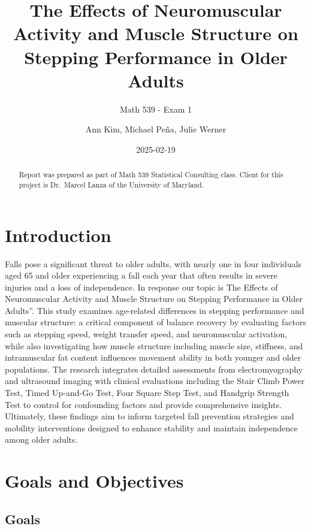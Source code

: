 \documentclass[
  letterpaper,
  DIV=11,
  numbers=noendperiod]{scrartcl}
\title{The Effects of Neuromuscular Activity and Muscle Structure on
Stepping Performance in Older Adults}
\subtitle{Math 539 - Exam 1}
\author{Ann Kim, Michael Peña, Julie Werner}
\date{2025-02-19}
\renewcommand*\contentsname{Table of contents}
\newcommand\contentsname{Table of contents}
\begin{document}
\maketitle
\begin{abstract}
\noindent Report was prepared as part of Math 539 Statistical Consulting
class. Client for this project is Dr.~Marcel Lanza of the University of
Maryland.
\end{abstract}

\renewcommand*\contentsname{Table of contents}
{
\hypersetup{linkcolor=}
\setcounter{tocdepth}{3}
\tableofcontents
}
\newpage

\section{Introduction}\label{introduction}

Falls pose a significant threat to older adults, with nearly one in four
individuals aged 65 and older experiencing a fall each year that often
results in severe injuries and a loss of independence. In response our
topic is The Effects of Neuromuscular Activity and Muscle Structure on
Stepping Performance in Older Adults''. This study examines age-related
differences in stepping performance and muscular structure: a critical
component of balance recovery by evaluating factors such as stepping
speed, weight transfer speed, and neuromuscular activation, while also
investigating how muscle structure including muscle size, stiffness, and
intramuscular fat content influences movement ability in both younger
and older populations. The research integrates detailed assessments from
electromyography and ultrasound imaging with clinical evaluations
including the Stair Climb Power Test, Timed Up-and-Go Test, Four Square
Step Test, and Handgrip Strength Test to control for confounding factors
and provide comprehensive insights. Ultimately, these findings aim to
inform targeted fall prevention strategies and mobility interventions
designed to enhance stability and maintain independence among older
adults.

\section{Goals and Objectives}\label{goals-and-objectives}

\subsection{Goals}\label{goals}
\end{document}
